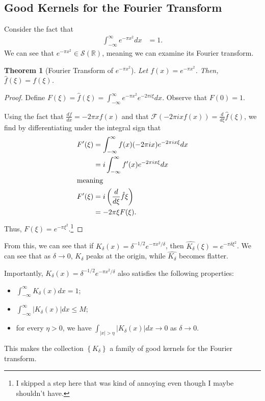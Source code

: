 \documentclass[12pt]{extarticle}
\newcommand{\R}{\mathbb{R}}
\newcommand{\set}[1]{\left\{#1\right\}}
\theoremstyle{plain}
\newtheorem*{theorem}{Theorem}%
\theoremstyle{definition}
\theoremstyle{remark}
\renewcommand{\newline}{\hfill\break}
\begin{document}
  \subsection{Good Kernels for the Fourier Transform}%
  Consider the fact that
  \begin{align*}
    \int_{-\infty}^{\infty}e^{-\pi x^2}dx &= 1.
  \end{align*}
  We can see that $e^{-\pi x^2}\in \mathcal{S}(\R)$, meaning we can examine its Fourier transform.
  \begin{theorem}[Fourier Transform of $e^{-\pi x^2}$]
    Let $f(x) = e^{-\pi x^2}$. Then, $\hat{f}(\xi) = f(\xi)$.
  \end{theorem}
  \begin{proof}
    Define $F(\xi) = \hat{f}(\xi) = \int_{-\infty}^{\infty}e^{-\pi x^2}e^{-2\pi i \xi}dx$. Observe that $F(0) = 1$.\newline

    Using the fact that $\frac{df}{dx} = -2\pi x f(x)$ and that $\mathcal{F}\left(-2\pi i x f(x)\right) = \frac{d}{d\xi}\hat{f}(\xi)$, we find by differentiating under the integral sign that
    \begin{align*}
      F'(\xi) &= \int_{-\infty}^{\infty}f(x)(-2\pi i x)e^{-2\pi i x \xi}dx\\
              &= i\int_{-\infty}^{\infty}f'(x)e^{-2\pi i x \xi}dx\\
              \intertext{meaning}
      F'(\xi) &= i\left(\frac{d}{d\xi}\hat{f}\xi\right)\\
              &= -2\pi \xi F(\xi).
    \end{align*}
    Thus, $F(\xi) = e^{-\pi \xi^2}$.\footnote{I skipped a step here that was kind of annoying even though I maybe shouldn't have.}
  \end{proof}
  From this, we can see that if $K_{\delta}(x) = \delta^{-1/2}e^{-\pi x^2/\delta}$, then $\widehat{K_{\delta}}(\xi) = e^{-\pi \delta \xi^2}$. We can see that as $\delta \rightarrow 0$, $K_{\delta}$ peaks at the origin, while $\widehat{K_{\delta}}$ becomes flatter.\newline

  Importantly, $K_{\delta}(x) = \delta^{-1/2}e^{-\pi x^2/\delta}$ also satisfies the following properties:
  \begin{itemize}
    \item $\displaystyle \int_{-\infty}^{\infty}K_{\delta}(x)dx = 1$;
    \item $\displaystyle \int_{-\infty}^{\infty}\left\vert K_{\delta}(x)\right\vert dx \leq M$;
    \item for every $\eta > 0$, we have $\displaystyle\int_{|x| > \eta}\left\vert K_{\delta}(x)\right\vert dx \rightarrow 0$ as $\delta \rightarrow 0$.
  \end{itemize}
  This makes the collection $\set{K_{\delta}}$ a family of good kernels for the Fourier transform.\newline
\end{document}
